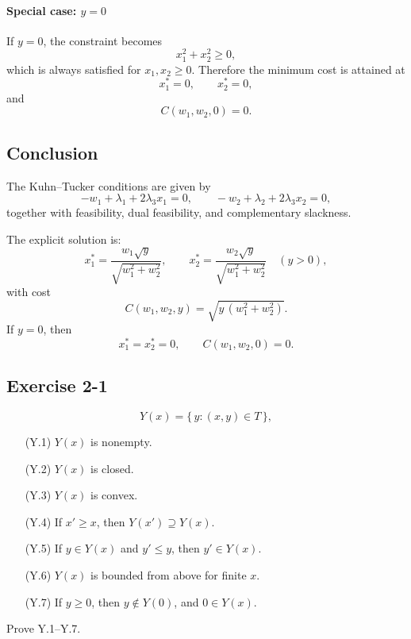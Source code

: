 \paragraph{Special case: \(y=0\)}
If \(y=0\), the constraint becomes
\[
x_1^2+x_2^2\ge 0,
\]
which is always satisfied for \(x_1,x_2\ge 0\). Therefore the minimum cost is attained at
\[
\boxed{x_1^*=0,\qquad x_2^*=0,}
\]
and
\[
\boxed{C(w_1,w_2,0)=0.}
\]

\subsection*{Conclusion}

The Kuhn--Tucker conditions are given by
\[
-w_1+\lambda_1+2\lambda_3x_1=0,\qquad
-w_2+\lambda_2+2\lambda_3x_2=0,
\]
together with feasibility, dual feasibility, and complementary slackness.

The explicit solution is:
\[
\boxed{
x_1^*
=
\frac{w_1\sqrt{y}}{\sqrt{w_1^2+w_2^2}},
\qquad
x_2^*
=
\frac{w_2\sqrt{y}}{\sqrt{w_1^2+w_2^2}}
\quad (y>0),
}
\]
with cost
\[
\boxed{
C(w_1,w_2,y)=\sqrt{y\,(w_1^2+w_2^2)}.
}
\]
If \(y=0\), then
\[
\boxed{x_1^*=x_2^*=0,\qquad C(w_1,w_2,0)=0.}
\]




\vspace{30pt}
\begin{tcolorbox}[breakable]

\subsection*{Exercise 2-1}

\[
Y(x)=\{\,y : (x,y)\in T\,\},
\]

\begin{itemize}
\item[(Y.1)] \(Y(x)\) is nonempty.
\item[(Y.2)] \(Y(x)\) is closed.
\item[(Y.3)] \(Y(x)\) is convex.
\item[(Y.4)] If \(x' \geq x\), then \(Y(x') \supseteq Y(x)\).
\item[(Y.5)] If \(y \in Y(x)\) and \(y' \leq y\), then \(y' \in Y(x)\).
\item[(Y.6)] \(Y(x)\) is bounded from above for finite \(x\).
\item[(Y.7)] If \(y \ge 0\), then \(y \notin Y(0)\), and \(0 \in Y(x)\).
\end{itemize}

Prove Y.1--Y.7.

\end{tcolorbox}


